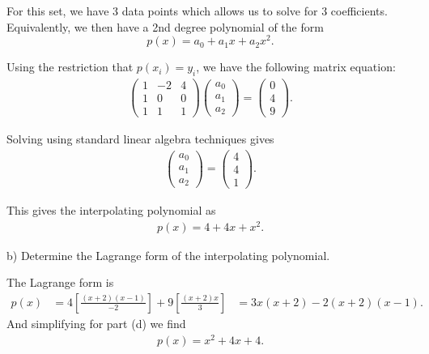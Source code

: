 \documentclass[12pt,a4paper]{article}
\begin{document}
For this set, we have 3 data points which allows us to solve for 3 coefficients. Equivalently, we then have a 2nd degree polynomial of the form
\[
p\left( x \right) = a_0 + a_1 x + a_2 x^2
.\]

Using the restriction that $p\left( x_{i} \right) = y_{i}$, we have the following matrix equation:
\begin{align*}
    \begin{pmatrix}
        1 & -2 & 4 \\
        1 &  0 & 0 \\
        1 &  1 &  1
    \end{pmatrix} 
    \begin{pmatrix}
    a_0 \\ 
    a_1 \\
    a_2
    \end{pmatrix}
    =
    \begin{pmatrix}
    0 \\
    4 \\
    9
    \end{pmatrix} 
.\end{align*}

Solving using standard linear algebra techniques gives
\begin{align*}
    \begin{pmatrix}
    a_0 \\
    a_1 \\
    a_2
    \end{pmatrix}
    =
   \begin{pmatrix}
   4 \\
   4 \\
   1
   \end{pmatrix}  
.\end{align*}

This gives the interpolating polynomial as
\begin{align*}
    p(x) = 4 + 4x + x^2
.\end{align*}

b) Determine the Lagrange form of the interpolating polynomial.

The Lagrange form is 
\begin{align*}
    p(x) &= 4\left[ \frac{\left( x+2 \right)\left( x-1 \right)}{-2} \right] + 9\left[ \frac{\left( x+2 \right)x}{3} \right]
    &= 3x\left( x+2 \right) -2\left( x+2 \right)\left( x-1 \right)
.\end{align*}
And simplifying for part (d) we find
\begin{align*}
   p\left( x \right) = x^2 + 4x + 4 
.\end{align*}
\end{document}
